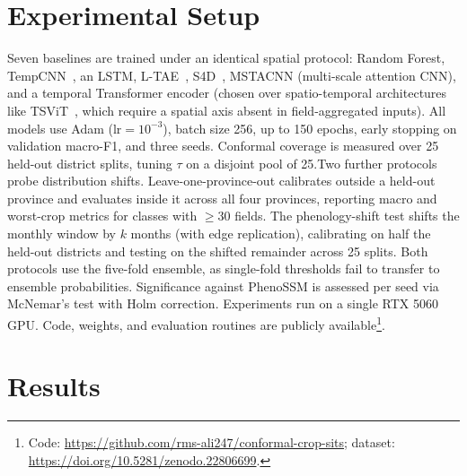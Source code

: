 \documentclass[conference]{IEEEtran}
\begin{document}
\section{Experimental Setup}
Seven baselines are trained under an identical spatial protocol: Random Forest, TempCNN~\cite{pelletier2019tempcnn}, an LSTM, L-TAE~\cite{garnot2020ltae}, S4D~\cite{gu2022s4d}, MSTACNN (multi-scale attention CNN), and a temporal Transformer encoder (chosen over spatio-temporal architectures like TSViT~\cite{tarasiou2023tsvit}, which require a spatial axis absent in field-aggregated inputs). All models use Adam ($\text{lr}=10^{-3}$), batch size 256, up to 150 epochs, early stopping on validation macro-F1, and three seeds. Conformal coverage is measured over 25 held-out district splits, tuning $\tau$ on a disjoint pool of 25.Two further protocols probe distribution shifts. Leave-one-province-out calibrates outside a held-out province and evaluates inside it across all four provinces, reporting macro and worst-crop metrics for classes with $\ge 30$ fields. The phenology-shift test shifts the monthly window by $k$ months (with edge replication), calibrating on half the held-out districts and testing on the shifted remainder across 25 splits. Both protocols use the five-fold ensemble, as single-fold thresholds fail to transfer to ensemble probabilities. Significance against PhenoSSM is assessed per seed via McNemar's test with Holm correction. Experiments run on a single RTX 5060 GPU. Code, weights, and evaluation routines are publicly available\footnote{Code: \url{https://github.com/rms-ali247/conformal-crop-sits}; dataset: \url{https://doi.org/10.5281/zenodo.22806699}.}.

\section{Results}
\end{document}
